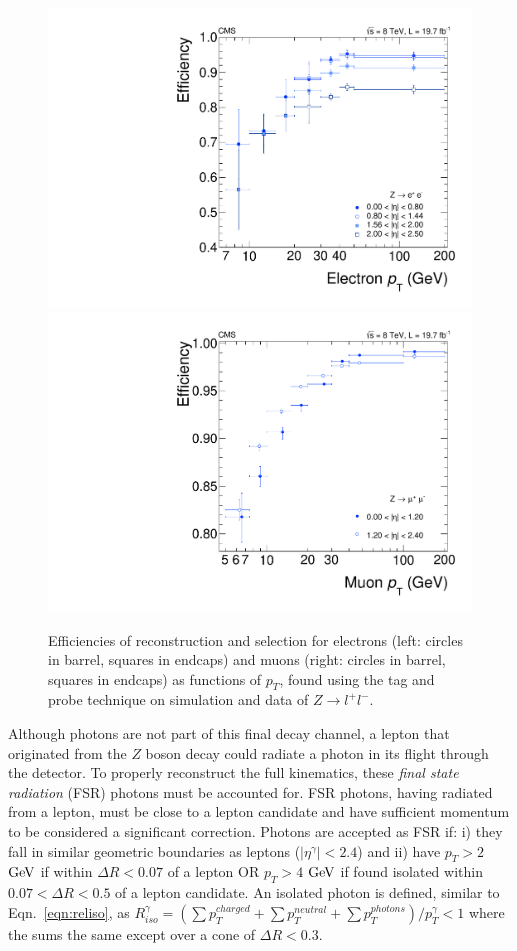 \begin{figure}[htbp]
\begin{center}
\includegraphics[width=.45\linewidth]{HiggsDiscovery/figures/electron_efficiency.pdf}
\includegraphics[width=.45\linewidth]{HiggsDiscovery/figures/muon_efficiency.pdf}
\caption[Overall Efficiencies of Electron and Muon Reconstruction and Selection in $4\ell$ Analysis]{Efficiencies of reconstruction and selection for electrons (left: circles in barrel, squares in endcaps) and muons (right: circles in barrel, squares in endcaps) as functions of $p_T$, found using the tag and probe technique on simulation and data of $Z\rightarrow l^+l^-$. }
\label{fig:LeptonEfficiencies}
\end{center}
\end{figure}

Although photons are not part of this final decay channel, a lepton that originated from the $Z$ boson decay could radiate a photon in its flight through the detector. To properly reconstruct the full kinematics, these \textit{final state radiation} (FSR) photons must be accounted for. FSR photons, having radiated from a lepton, must be close to a lepton candidate and have sufficient momentum to be considered a significant correction. Photons are accepted as FSR if: i) they fall in similar geometric boundaries as leptons ($|\eta^\gamma|<2.4$) and ii) have $p_T>2$ $\rm{GeV}$ if within $\Delta R < 0.07$ of a lepton OR $p_T>4$ $\rm{GeV}$ if found isolated within $0.07 < \Delta R < 0.5$ of a lepton candidate. An isolated photon is defined, similar to Eqn.~\ref{eqn:reliso}, as $R_{iso}^{\gamma} = (\sum p_T^{charged} + \sum p_T^{neutral} + \sum p_T^{photons})/p_T^\gamma < 1$ where the sums the same except over a cone of $\Delta R < 0.3$.

